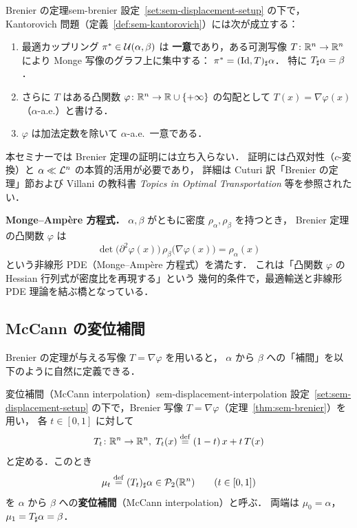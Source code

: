 \begin{theorem}{Brenier の定理}{sem-brenier}
  設定~\ref{set:sem-displacement-setup} の下で，
  Kantorovich 問題（定義~\ref{def:sem-kantorovich}）には次が成立する：
  \begin{enumerate}
    \item[\textup{(1)}] 最適カップリング $\pi^* \in \mathcal{U}(\alpha, \beta)$ は
      \textbf{一意}であり，ある可測写像 $T \colon \mathbb{R}^n \to \mathbb{R}^n$ により
      Monge 写像のグラフ上に集中する：
      $\pi^* = (\operatorname{Id}, T)_\sharp \alpha$．
      特に $T_\sharp \alpha = \beta$．
    \item[\textup{(2)}] さらに $T$ はある凸関数
      $\varphi \colon \mathbb{R}^n \to \mathbb{R} \cup \{+\infty\}$ の勾配として
      $T(x) = \nabla \varphi(x)$（$\alpha$-a.e.）と書ける．
    \item[\textup{(3)}] $\varphi$ は加法定数を除いて $\alpha$-a.e.\ 一意である．
  \end{enumerate}
\end{theorem}

本セミナーでは Brenier 定理の証明には立ち入らない．
証明には凸双対性（$c$-変換）と $\alpha \ll \mathcal{L}^n$ の本質的活用が必要であり，
詳細は Cuturi 訳「Brenier の定理」節および Villani の教科書
\textit{Topics in Optimal Transportation} 等を参照されたい．

\begin{memo*}
  \textbf{Monge--Amp\`{e}re 方程式．}
  $\alpha, \beta$ がともに密度 $\rho_\alpha, \rho_\beta$ を持つとき，
  Brenier 定理の凸関数 $\varphi$ は
  \[
    \det\bigl( \partial^2 \varphi(x) \bigr) \,
    \rho_\beta\bigl( \nabla \varphi(x) \bigr) = \rho_\alpha(x)
  \]
  という非線形 PDE（Monge--Amp\`{e}re 方程式）を満たす．
  これは「凸関数 $\varphi$ の Hessian 行列式が密度比を再現する」という
  幾何的条件で，最適輸送と非線形 PDE 理論を結ぶ橋となっている．
\end{memo*}

\subsection{McCann の変位補間}

Brenier の定理が与える写像 $T = \nabla \varphi$ を用いると，
$\alpha$ から $\beta$ への「補間」を以下のように自然に定義できる．

\begin{definition}{変位補間（McCann interpolation）}{sem-displacement-interpolation}
  設定~\ref{set:sem-displacement-setup} の下で，Brenier 写像
  $T = \nabla \varphi$（定理~\ref{thm:sem-brenier}）を用い，
  各 $t \in [0, 1]$ に対して
  \[
    T_t \colon \mathbb{R}^n \to \mathbb{R}^n,\;
    T_t(x) \overset{\mathrm{def}}{=} (1 - t)\, x + t\, T(x)
  \]
  と定める．このとき
  \[
    \mu_t \overset{\mathrm{def}}{=} (T_t)_\sharp \alpha \in \mathcal{P}_2(\mathbb{R}^n)
    \qquad (t \in [0, 1])
  \]
  を $\alpha$ から $\beta$ への\textbf{変位補間}（McCann interpolation）と呼ぶ．
  両端は $\mu_0 = \alpha$，$\mu_1 = T_\sharp \alpha = \beta$．
\end{definition}

